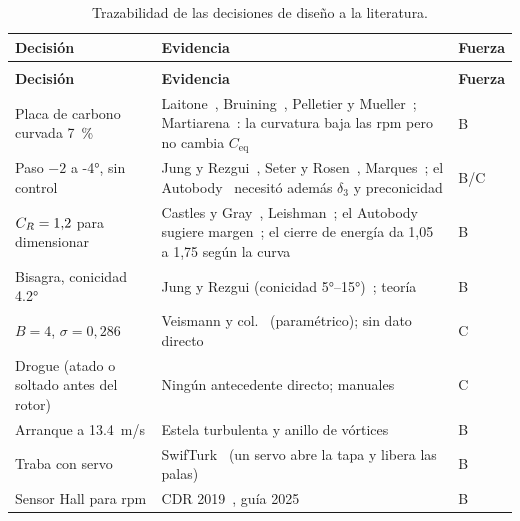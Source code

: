 {\footnotesize
\begin{longtable}{@{}>{\raggedright\arraybackslash}p{3.3cm} >{\raggedright\arraybackslash}p{\dimexpr\textwidth-3.3cm-1.2cm-4\tabcolsep\relax} >{\centering\arraybackslash}p{1.2cm}@{}}
\caption{Trazabilidad de las decisiones de diseño a la literatura.}\label{tab:literatura-trazab}\\
\toprule
\textbf{Decisión} & \textbf{Evidencia} & \textbf{Fuerza}\\\midrule
\endfirsthead
\multicolumn{3}{@{}l}{\emph{Tabla~\thetable\ (continuación)}}\\\toprule
\textbf{Decisión} & \textbf{Evidencia} & \textbf{Fuerza}\\\midrule
\endhead
\bottomrule
\endlastfoot
Placa de carbono curvada \SI{7}{\percent} & Laitone~\cite{literatura-laitone1997}, Bruining~\cite{literatura-bruining1979}, Pelletier y Mueller~\cite{pelletier2000}; Martiarena~\cite{literatura-martiarena2015}: la curvatura baja las rpm pero no cambia $C_{\mathrm{eq}}$ & B\\
Paso $-2$ a \ang{-4}, sin control & Jung y Rezgui~\cite{literatura-jung2024}, Seter y Rosen~\cite{literatura-seter2014}, Marques~\cite{literatura-marques2024}; el Autobody~\cite{literatura-brindejonc2007} necesitó además $\delta_3$ y preconicidad & B/C\\
$C_{R}=1{,}2$ para dimensionar & Castles y Gray~\cite{castles1951}, Leishman~\cite{leishman2006}; el Autobody sugiere margen~\cite{literatura-brindejonc2007}; el cierre de energía da 1,05 a 1,75 según la curva & B\\
Bisagra, conicidad \ang{4.2} & Jung y Rezgui (conicidad \ang{5}--\ang{15})~\cite{literatura-jung2024}; teoría~\cite{johnson1980} & B\\
$B=4$, $\sigma=0{,}286$ & Veismann y col.~\cite{literatura-veismann2022} (paramétrico); sin dato directo & C\\
Drogue (atado o soltado antes del rotor) & Ningún antecedente directo; manuales~\cite{knacke1992,literatura-scher1971} & C\\
Arranque a \SI{13.4}{m/s} & Estela turbulenta y anillo de vórtices~\cite{literatura-stack2005,literatura-shetty2011,leishman2004} & B\\
Traba con servo & SwifTurk~\cite{literatura-swifturk2019} (un servo abre la tapa y libera las palas) & B\\
Sensor Hall para rpm & CDR 2019~\cite{literatura-swifturk2019}, guía 2025~\cite{cansat2025} & B\\
\end{longtable}
}

